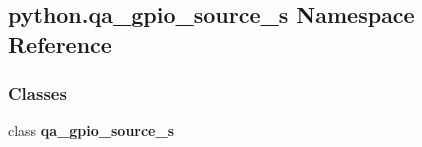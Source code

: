 \subsection{python.\+qa\+\_\+gpio\+\_\+source\+\_\+s Namespace Reference}
\label{namespacepython_1_1qa__gpio__source__s}
\subsubsection*{Classes}
\begin{DoxyCompactItemize}
\item 
class {\bf qa\+\_\+gpio\+\_\+source\+\_\+s}
\end{DoxyCompactItemize}
